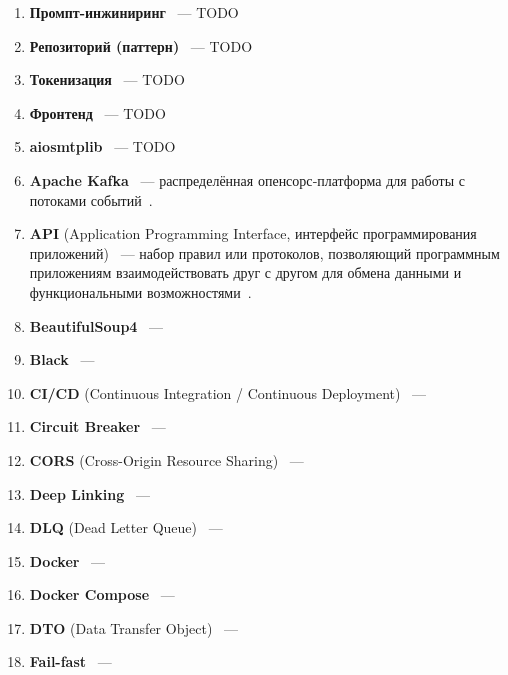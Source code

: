 \begin{enumerate}
    \item \textbf{Промпт-инжиниринг} ~--- TODO
    
    \item \textbf{Репозиторий (паттерн)} ~--- TODO
    
    \item \textbf{Токенизация} ~--- TODO
    
    \item \textbf{Фронтенд} ~--- TODO
    

    \item \textbf{aiosmtplib} ~--- TODO
    
    \item \textbf{Apache Kafka} ~--- распределённая опенсорс‑платформа для работы с потоками событий~\cite{kafka_def}. 
    
    \item \textbf{API} (Application Programming Interface, интерфейс программирования приложений) ~--- набор правил или протоколов, позволяющий программным приложениям взаимодействовать друг с другом для обмена данными и функциональными возможностями~\cite{api_def}.

    \item \textbf{BeautifulSoup4} ~--- 
    
    \item \textbf{Black} ~--- 
    
    \item \textbf{CI/CD} (Continuous Integration / Continuous Deployment) ~--- 
    
    \item \textbf{Circuit Breaker} ~--- 
    
    \item \textbf{CORS} (Cross-Origin Resource Sharing) ~--- 
    
    \item \textbf{Deep Linking} ~--- 
    
    \item \textbf{DLQ} (Dead Letter Queue) ~--- 
    
    \item \textbf{Docker} ~--- 
    
    \item \textbf{Docker Compose} ~--- 
    
    \item \textbf{DTO} (Data Transfer Object) ~--- 
    
    \item \textbf{Fail-fast} ~--- 
    

\end{enumerate}
